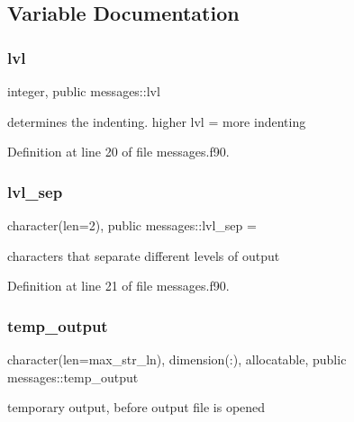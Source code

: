 \subsection{Variable Documentation}
\mbox{\label{namespacemessages_a36521a46e57da1d3be83019abdff132e}} 
\subsubsection{\texorpdfstring{lvl}{lvl}}
{\footnotesize\ttfamily integer, public messages\+::lvl}



determines the indenting. higher {\ttfamily lvl} = more indenting 



Definition at line 20 of file messages.\+f90.

\mbox{\label{namespacemessages_ab1101c3acf2edc71877d4aa71aa3d931}} 
\subsubsection{\texorpdfstring{lvl\+\_\+sep}{lvl\_sep}}
{\footnotesize\ttfamily character(len=2), public messages\+::lvl\+\_\+sep = \textquotesingle{}\textquotesingle{}}



characters that separate different levels of output 



Definition at line 21 of file messages.\+f90.

\mbox{\label{namespacemessages_a07070e72f15146af24816c39eea17088}} 
\subsubsection{\texorpdfstring{temp\+\_\+output}{temp\_output}}
{\footnotesize\ttfamily character(len=max\+\_\+str\+\_\+ln), dimension(\+:), allocatable, public messages\+::temp\+\_\+output}



temporary output, before output file is opened 



